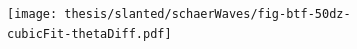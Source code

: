 \begin{figure}
	\centering
	\begin{subfigure}{\textwidth}
		\centering
		\texttt{[image: thesis/slanted/schaerWaves/fig-btf-50dz-cubicFit-thetaDiff.pdf]}
	\end{subfigure}
	\caption{}
	\label{fig:slanted:schaerWaves:thetaDiff}
\end{figure}
